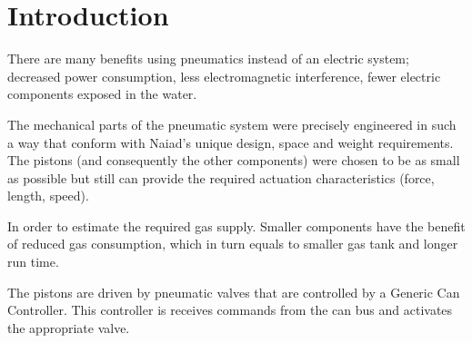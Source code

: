 \section{Introduction}\label{sec:introduction}
There are many benefits using pneumatics instead of an electric  system; decreased power consumption, less electromagnetic interference, fewer electric components exposed in the water.

The mechanical parts of the pneumatic system were precisely engineered in such a way that conform with Naiad's unique design, space and weight requirements. The pistons (and consequently the other components) were chosen to be as small as possible but still can provide the required actuation characteristics (force, length, speed).

In order to estimate the required gas supply. Smaller components have the benefit of reduced gas consumption, which in turn equals to smaller gas tank and longer run time.

The pistons are driven by pneumatic valves that are controlled by a Generic Can Controller. This controller is receives commands from the can bus and activates the appropriate valve.
